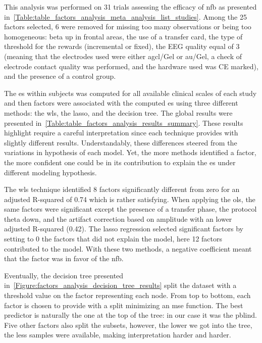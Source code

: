 This analysis was performed on 31 trials assessing the efficacy of \gls{nfb} as presented 
in~\ref{Table:table_factors_analysis_meta_analysis_list_studies}. Among the 25 factors selected, 6 were 
removed for missing too many observations or being too homogeneous: beta up in frontal areas, 
the use of a transfer card, the type of threshold for the rewards (incremental or fixed), the EEG quality equal of 3
(meaning that the electrodes used were either \gls{agcl}/Gel or \gls{au}/Gel, a check of electrode contact quality was
performed, and the hardware used was CE marked), and the presence of a control group. 

The \gls{es} within subjects was computed for all available clinical scales of each study and then factors were 
associated with the computed \gls{es} using three different methods: the \gls{wls}, the \gls{lasso}, and the decision tree. 
The global results were presented in~\ref{Table:table_factors_analysis_results_summary}. These results highlight require a 
careful interpretation since each technique provides with slightly different results. Understandably, these differences 
steered from the variations in hypothesis of each model. Yet, the more methods identified a factor, the more confident 
one could be in its contribution to explain the \gls{es} under different modeling hypothesis.

The \gls{wls} technique identified 8 factors significantly different from zero for an adjusted R-squared of 0.74
which is rather satisfying. When applying the \gls{ols}, the same factors were significant except the presence of 
a transfer phase, the protocol theta down, and the artifact correction based on amplitude with an lower adjusted R-squared 
(0.42). The \gls{lasso} regression selected significant factors by setting to 0 the factors that did not explain the model, 
here 12 factors contributed to the model. With these two methods, a negative coefficient meant that the factor was in favor 
of the \gls{nfb}.

Eventually, the decision tree presented in~\ref{Figure:factors_analysis_decision_tree_results} split the dataset
with a threshold value on the factor representing each node. From top to bottom, each factor is chosen to provide with a
split minimizing an \gls{mse} function. The best predictor is naturally the one at the top of the tree: in our case it was 
the \gls{pblind}. Five other factors also split the subsets, however, the lower we got into the tree, the less samples were 
available, making interpretation harder and harder.  

